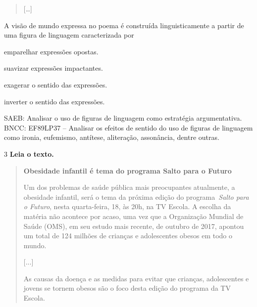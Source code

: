 \begin{quote}
{[}\ldots{]}
\end{quote}


A visão de mundo expressa no poema é construída linguisticamente a
partir de uma figura de linguagem caracterizada por

\begin{escolha}
\item emparelhar expressões opostas.

\item suavizar expressões impactantes.

\item exagerar o sentido das expressões.

\item inverter o sentido das expressões.
\end{escolha}

SAEB: Analisar o uso de figuras de linguagem como estratégia
argumentativa. BNCC: EF89LP37 -- Analisar os efeitos de sentido do uso
de figuras de linguagem como ironia, eufemismo, antítese, aliteração,
assonância, dentre outras.

\num{3} \textbf{Leia o texto.}

\begin{quote}
\textbf{Obesidade infantil é tema do programa Salto para o Futuro}

Um dos problemas de saúde pública mais preocupantes atualmente, a
obesidade infantil, será o tema da próxima edição do
programa~\emph{Salto para o Futuro}, nesta quarta-feira, 18, às 20h, na
TV Escola. A escolha da matéria não acontece por acaso, uma vez que a
Organização Mundial de Saúde (OMS), em seu estudo mais recente, de
outubro de 2017, apontou um total de 124 milhões de crianças e
adolescentes obesos em todo o mundo.

{[}...{]}

As causas da doença e as medidas para evitar que crianças, adolescentes
e jovens se tornem obesos são o foco desta edição do programa da TV
Escola.
\end{quote}


